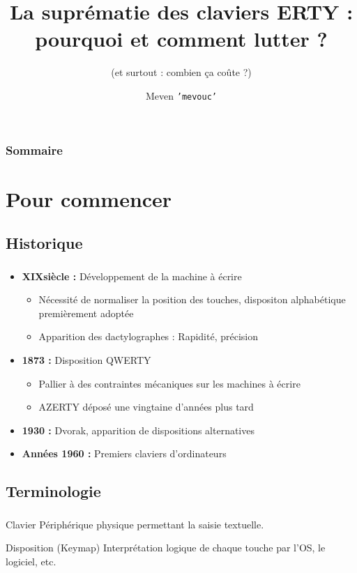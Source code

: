 \documentclass[c,12pt]{beamer}
\title{La suprématie des claviers ERTY : pourquoi et comment lutter ?}
\subtitle{(et surtout : combien ça coûte ?)}
\author{Meven \texttt{'mevouc'} \bsc{Courouble}}
\date{\oldstylenums{3 décembre 2015}}
\begin{document}

\begin{frame}
	\frametitle{Sommaire}
	\tableofcontents[hideallsubsections]
\end{frame}

\section{Pour commencer}
\subsection{Historique}

\begin{frame}
	\frametitle{\subsecname}
	\begin{itemize}
		\item<1-> \textbf{XIX\ieme siècle :} Développement de la machine à écrire
			\begin{itemize}
				\item<2-> Nécessité de normaliser la position des touches, dispositon
					alphabétique premièrement adoptée
				\item<3-> Apparition des dactylographes : Rapidité, précision
			\end{itemize}
		\item<4-> \textbf{1873 :} Disposition QWERTY
			\begin{itemize}
				\item<5-> Pallier à des contraintes mécaniques sur les machines à écrire
				\item<6-> AZERTY déposé une vingtaine d'années plus tard
			\end{itemize}
		\item<7-> \textbf{1930 :} Dvorak, apparition de dispositions alternatives
		\item \textbf{Années 1960 :} Premiers claviers d'ordinateurs
	\end{itemize}
\end{frame}

\subsection{Terminologie}

\begin{frame}
	\frametitle{\subsecname}
	\begin{block}{Clavier}
		Périphérique physique permettant la saisie textuelle.
	\end{block}
	\begin{block}{Disposition (Keymap)}
		Interprétation logique de chaque touche par l'OS, le logiciel, etc.
	\end{block}
\end{frame}
\end{document}
